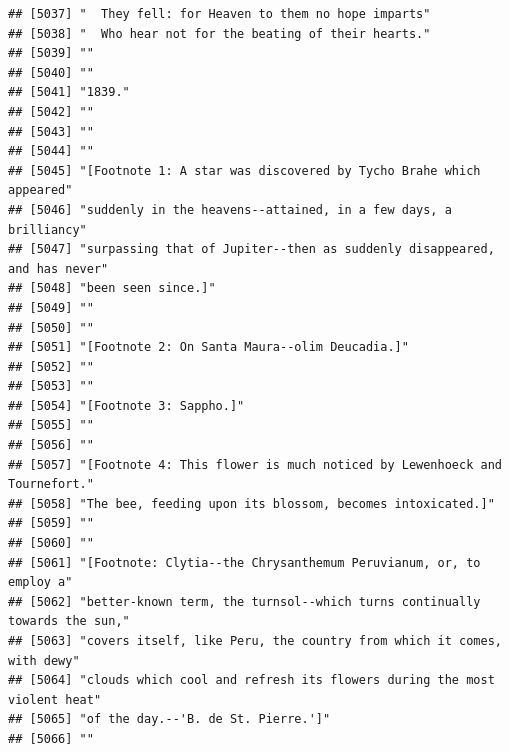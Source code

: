 \documentclass{article}\usepackage[]{graphicx}\usepackage[]{color}
\makeatletter
\newenvironment{kframe}{%
 \def\at@end@of@kframe{}%
 \ifinner\ifhmode%
  \def\at@end@of@kframe{\end{minipage}}%
  \begin{minipage}{\columnwidth}%
 \fi\fi%
 \def\FrameCommand##1{\hskip\@totalleftmargin \hskip-\fboxsep
 \colorbox{shadecolor}{##1}\hskip-\fboxsep
     \hskip-\linewidth \hskip-\@totalleftmargin \hskip\columnwidth}%
 \MakeFramed {\advance\hsize-\width
   \@totalleftmargin\z@ \linewidth\hsize
   \@setminipage}}%
 {\par\unskip\endMakeFramed%
 \at@end@of@kframe}
\newenvironment{knitrout}{}{} %
\makeatother
\begin{document}
\begin{knitrout}
\begin{kframe}
\begin{verbatim}
## [5037] "  They fell: for Heaven to them no hope imparts"                             
## [5038] "  Who hear not for the beating of their hearts."                             
## [5039] ""                                                                            
## [5040] ""                                                                            
## [5041] "1839."                                                                       
## [5042] ""                                                                            
## [5043] ""                                                                            
## [5044] ""                                                                            
## [5045] "[Footnote 1: A star was discovered by Tycho Brahe which appeared"            
## [5046] "suddenly in the heavens--attained, in a few days, a brilliancy"              
## [5047] "surpassing that of Jupiter--then as suddenly disappeared, and has never"     
## [5048] "been seen since.]"                                                           
## [5049] ""                                                                            
## [5050] ""                                                                            
## [5051] "[Footnote 2: On Santa Maura--olim Deucadia.]"                                
## [5052] ""                                                                            
## [5053] ""                                                                            
## [5054] "[Footnote 3: Sappho.]"                                                       
## [5055] ""                                                                            
## [5056] ""                                                                            
## [5057] "[Footnote 4: This flower is much noticed by Lewenhoeck and Tournefort."      
## [5058] "The bee, feeding upon its blossom, becomes intoxicated.]"                    
## [5059] ""                                                                            
## [5060] ""                                                                            
## [5061] "[Footnote: Clytia--the Chrysanthemum Peruvianum, or, to employ a"            
## [5062] "better-known term, the turnsol--which turns continually towards the sun,"    
## [5063] "covers itself, like Peru, the country from which it comes, with dewy"        
## [5064] "clouds which cool and refresh its flowers during the most violent heat"      
## [5065] "of the day.--'B. de St. Pierre.']"                                           
## [5066] ""                                                                            

\end{verbatim}
\end{kframe}
\end{knitrout}
\end{document}
